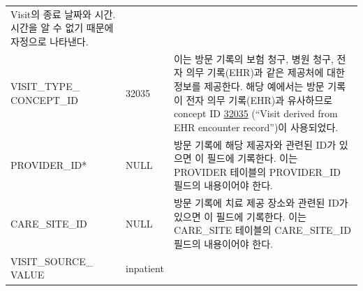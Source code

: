 \documentclass[11pt]{book}
\theoremstyle{definition}
\theoremstyle{definition}
\theoremstyle{definition}
\theoremstyle{remark}
\begin{document}
\begin{longtable}[]{@{}lll@{}}
\begin{minipage}[t]{0.48\columnwidth}
Visit의 종료 날짜와 시간. 시간을 알 수 없기 때문에 자정으로
나타낸다.\strut
\end{minipage}\tabularnewline
\begin{minipage}[t]{0.28\columnwidth}\raggedright\strut
VISIT\_TYPE\_ CONCEPT\_ID\strut
\end{minipage} & \begin{minipage}[t]{0.16\columnwidth}\raggedright\strut
32035\strut
\end{minipage} & \begin{minipage}[t]{0.48\columnwidth}\raggedright\strut
이는 방문 기록의 보험 청구, 병원 청구, 전자 의무 기록(EHR)과 같은
제공처에 대한 정보를 제공한다. 해당 예에서는 방문 기록이 전자 의무
기록(EHR)과 유사하므로 concept ID
\href{http://athena.ohdsi.org/search-terms/terms/32035}{32035} (``Visit
derived from EHR encounter record'')이 사용되었다.\strut
\end{minipage}\tabularnewline
\begin{minipage}[t]{0.28\columnwidth}\raggedright\strut
PROVIDER\_ID*\strut
\end{minipage} & \begin{minipage}[t]{0.16\columnwidth}\raggedright\strut
NULL\strut
\end{minipage} & \begin{minipage}[t]{0.48\columnwidth}\raggedright\strut
방문 기록에 해당 제공자와 관련된 ID가 있으면 이 필드에 기록한다. 이는
PROVIDER 테이블의 PROVIDER\_ID 필드의 내용이어야 한다.\strut
\end{minipage}\tabularnewline
\begin{minipage}[t]{0.28\columnwidth}\raggedright\strut
CARE\_SITE\_ID\strut
\end{minipage} & \begin{minipage}[t]{0.16\columnwidth}\raggedright\strut
NULL\strut
\end{minipage} & \begin{minipage}[t]{0.48\columnwidth}\raggedright\strut
방문 기록에 치료 제공 장소와 관련된 ID가 있으면 이 필드에 기록한다. 이는
CARE\_SITE 테이블의 CARE\_SITE\_ID 필드의 내용이어야 한다.\strut
\end{minipage}\tabularnewline
\begin{minipage}[t]{0.28\columnwidth}\raggedright\strut
VISIT\_SOURCE\_ VALUE\strut
\end{minipage} & \begin{minipage}[t]{0.16\columnwidth}\raggedright\strut
inpatient\strut
\end{minipage} & \begin{minipage}[t]{0.48\columnwidth}\raggedright\strut

\end{minipage}
\end{longtable}
\end{document}
